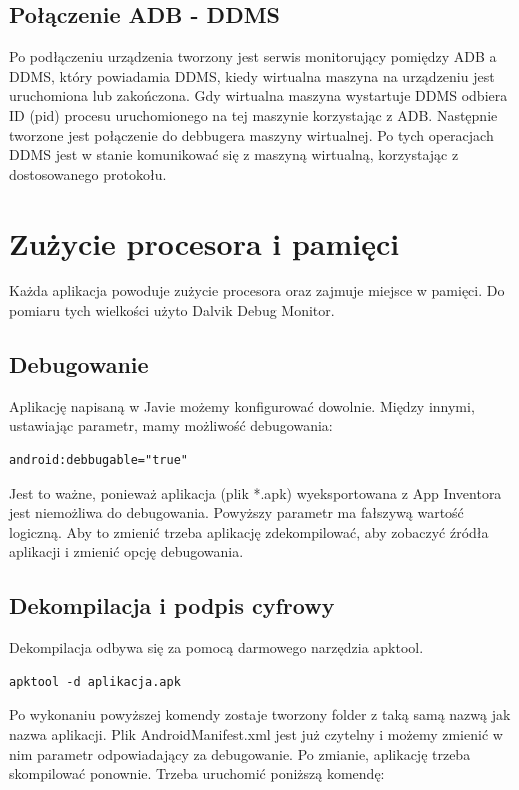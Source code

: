 \subsection{Połączenie ADB - DDMS}

Po podłączeniu urządzenia tworzony jest serwis monitorujący pomiędzy ADB a DDMS, który powiadamia DDMS, kiedy wirtualna maszyna na urządzeniu jest uruchomiona lub zakończona. Gdy wirtualna maszyna wystartuje DDMS odbiera ID (pid) procesu uruchomionego na tej maszynie korzystając z ADB. Następnie tworzone jest połączenie do debbugera maszyny wirtualnej. Po tych operacjach DDMS jest w stanie komunikować się z maszyną wirtualną, korzystając z dostosowanego protokołu.\cite{doc:ddms}



\section{Zużycie procesora i pamięci}

Każda aplikacja powoduje zużycie procesora oraz zajmuje miejsce w pamięci. Do pomiaru tych wielkości użyto Dalvik Debug Monitor.

\subsection{Debugowanie}
Aplikację napisaną w Javie możemy konfigurować dowolnie. Między innymi, ustawiając parametr, mamy możliwość debugowania: 

\begin{lstlisting}
android:debbugable="true"
\end{lstlisting}

Jest to ważne, ponieważ aplikacja (plik *.apk) wyeksportowana z App Inventora jest niemożliwa do debugowania. Powyższy parametr ma fałszywą wartość logiczną. Aby to zmienić trzeba aplikację zdekompilować, aby zobaczyć źródła aplikacji i zmienić opcję debugowania. 

\subsection{Dekompilacja i podpis cyfrowy}
Dekompilacja odbywa się za pomocą darmowego narzędzia apktool.

\begin{lstlisting}
apktool -d aplikacja.apk
\end{lstlisting}

Po wykonaniu powyższej komendy zostaje tworzony folder z taką samą nazwą jak nazwa aplikacji. Plik AndroidManifest.xml jest już czytelny i możemy zmienić w nim parametr odpowiadający za debugowanie. Po zmianie, aplikację trzeba skompilować ponownie. Trzeba uruchomić poniższą komendę:

